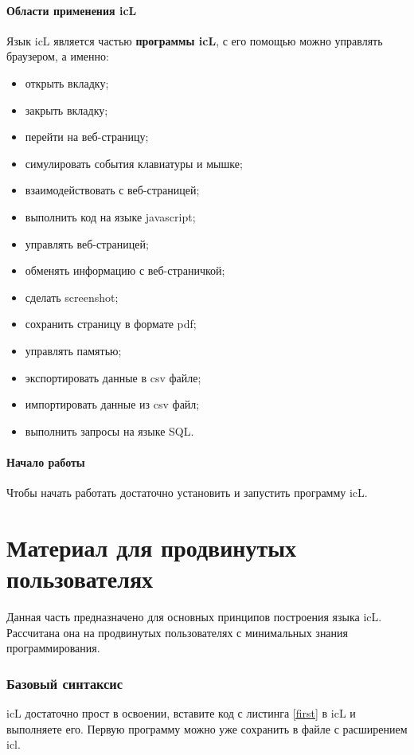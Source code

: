 \documentclass[a4paper, 14pt]{extarticle}
\newenvironment{icItems}
	{ \begin{itemize} [noitemsep,nolistsep] }
	{ \end{itemize} }
\begin{document}
\subsection{Области применения icL}

Язык icL является частью \textbf{программы icL}, с его помощью можно управлять браузером, а именно:
\begin{icItems}
\item
	открыть вкладку;
\item
	закрыть вкладку;
\item
	перейти на веб-страницу;
\item
	симулировать события клавиатуры и мышке;
\item
	взаимодействовать с веб-страницей;
\item
	выполнить код на языке javascript;
\item
	управлять веб-страницей;
\item
	обменять информацию с веб-страничкой;
\item
	сделать screenshot;
\item
	сохранить страницу в формате pdf;
\item
	управлять памятью;
\item
	экспортировать данные в csv файле;
\item
	импортировать данные из csv файл;
\item
	выполнить запросы на языке SQL.
\end{icItems}

\subsection{Начало работы}

Чтобы начать работать достаточно установить и запустить программу icL.

\newpage
\part{Материал для продвинутых пользователях}

Данная часть предназначено для основных принципов построения языка icL. Рассчитана она на продвинутых пользователях с минимальных знания программирования.

\section{Базовый синтаксис}

icL достаточно прост в освоении, вставите код с листинга \ref{first} в icL и выполняете его. Первую программу можно уже сохранить в файле с расширением icl.
\end{document}
